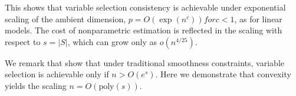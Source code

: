 This shows that variable selection consistency is achievable under
exponential scaling of the ambient dimension, $p = O(\exp(n^c))
for c<1$, as for linear models. The cost of nonparametric estimation is
reflected in the scaling with respect to $s=|S|$, which can grow only
as $o(n^{4/25})$.

We remark that \citet{dalalyan:12} show that under traditional smoothness
constraints, variable selection is achievable only if $n > O(e^s)$. 
Here we demonstrate that convexity yields the scaling $n =
O(\textrm{poly}(s))$.


